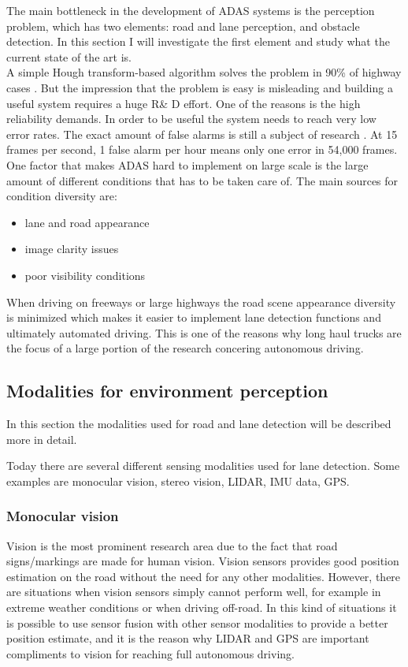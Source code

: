 The main bottleneck in the development of ADAS systems is the perception problem, which has two elements: road and lane perception, and obstacle detection. In this section I will investigate the first element and study what the current state of the art is.\\



A simple Hough transform-based algorithm solves the problem in 90\% of highway cases \cite{BarHillel2014}. 
But the impression that the problem is easy is misleading and building a useful system requires a huge R\& D effort. One of the reasons is the high reliability demands. In order to be useful the system needs to reach very low error rates. The exact amount of false alarms is still a subject of research \cite{BarHillel2014}.
At 15 frames per second, 1 false alarm per hour means only one error in 54,000 frames.\\


One factor that makes ADAS hard to implement on large scale is the large amount of different conditions that has to be taken care of. The main sources for condition diversity are:
\begin{itemize}  
\item lane and road appearance
\item image clarity issues
\item poor visibility conditions
\end{itemize}


When driving on freeways or large highways the road scene appearance diversity is minimized which makes it easier to implement lane detection functions and ultimately automated driving. This is one of the reasons why long haul trucks are the focus of a large portion of the research concering autonomous driving. 

\subsection{Modalities for environment perception}
In this section the modalities used for road and lane detection will be described more in detail. 

Today there are several different sensing modalities used for lane detection. Some examples are monocular vision, stereo vision, LIDAR, IMU data, GPS.\\

\subsubsection{Monocular vision}
Vision is the most prominent research area due to the fact that road signs/markings are made for human vision. Vision sensors provides good position estimation on the road without the need for any other modalities. However, there are situations when vision sensors simply cannot perform well, for example in extreme weather conditions or when driving off-road. In this kind of situations it is possible to use sensor fusion with other sensor modalities to provide a better position estimate, and it is the reason why LIDAR and GPS are important compliments to vision for reaching full autonomous driving.\\



